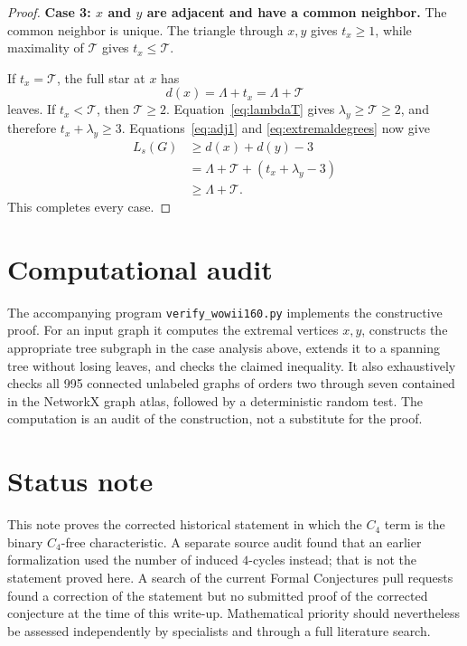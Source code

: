 \documentclass[11pt]{article}
\newcommand{\Ls}{L_s}
\newcommand{\Tau}{\mathcal{T}}
\begin{document}
\begin{proof}
\medskip
\noindent\textbf{Case 3: $x$ and $y$ are adjacent and have a common
neighbor.}
The common neighbor is unique.  The triangle through $x,y$ gives
$t_x\ge1$, while maximality of $\Tau$ gives $t_x\le\Tau$.

If $t_x=\Tau$, the full star at $x$ has
\[
  d(x)=\Lambda+t_x=\Lambda+\Tau
\]
leaves.  If $t_x<\Tau$, then $\Tau\ge2$.  Equation~\eqref{eq:lambdaT}
gives $\lambda_y\ge\Tau\ge2$, and therefore
$t_x+\lambda_y\ge3$.  Equations~\eqref{eq:adj1} and
\eqref{eq:extremaldegrees} now give
\[
\begin{aligned}
  \Ls(G)
  &\ge d(x)+d(y)-3\\
  &=\Lambda+\Tau+(t_x+\lambda_y-3)\\
  &\ge\Lambda+\Tau.
\end{aligned}
\]
This completes every case.
\end{proof}

\section{Computational audit}

The accompanying program \texttt{verify\_wowii160.py} implements the
constructive proof.  For an input graph it computes the extremal
vertices $x,y$, constructs the appropriate tree subgraph in the case
analysis above, extends it to a spanning tree without losing leaves,
and checks the claimed inequality.  It also exhaustively checks all
995 connected unlabeled graphs of orders two through seven contained
in the NetworkX graph atlas, followed by a deterministic random test.
The computation is an audit of the construction, not a substitute for
the proof.

\section*{Status note}

This note proves the corrected historical statement in which the
$C_4$ term is the binary $C_4$-free characteristic.  A separate source
audit found that an earlier formalization used the number of induced
$4$-cycles instead; that is not the statement proved here.  A search of
the current Formal Conjectures pull requests found a correction of the
statement but no submitted proof of the corrected conjecture at the
time of this write-up.  Mathematical priority should nevertheless be
assessed independently by specialists and through a full literature
search.
\end{document}
